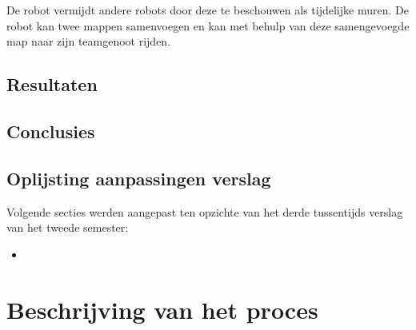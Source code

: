 \documentclass[eind]{penoverslag}
\begin{document}
De robot vermijdt andere robots door deze te beschouwen als tijdelijke muren. De robot kan twee mappen samenvoegen en kan met behulp van deze samengevoegde map naar zijn teamgenoot rijden.

\subsection{Resultaten}
\label{Assec:result3}

\subsection{Conclusies}
\label{Assec:conc3}

\subsection{Oplijsting aanpassingen verslag}
\label{Assec:aanp3}
Volgende secties werden aangepast ten opzichte van het derde tussentijds verslag van het tweede semester:

\begin{itemize}
\item
\end{itemize}


\section{Beschrijving van het proces}
\label{Assec:beschrijvingProces}
\end{document}
